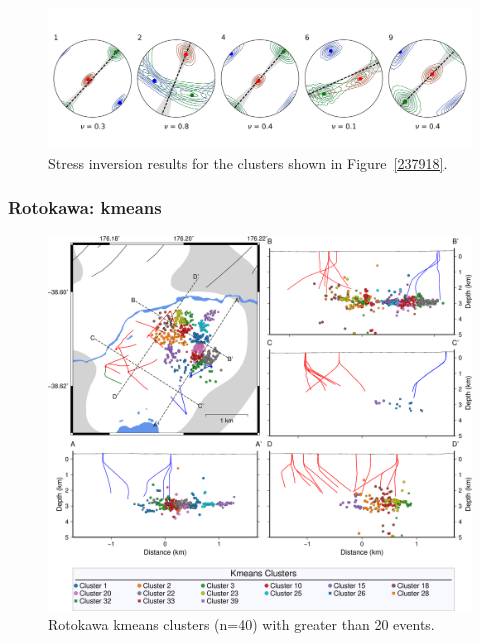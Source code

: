 \begin{figure}[h!]
\begin{center}
\includegraphics[width=0.98\columnwidth]{Chapter_5_FMs/figures/Nga_kmeans_inversion_10/Nga_kmeans_inversion_10_original}
\caption{{Stress inversion results for the clusters shown in
Figure~{\ref{237918}}.
{\label{838980}}%
}}
\end{center}
\end{figure}

\subsubsection{Rotokawa: kmeans}

\begin{figure}[h!]
\begin{center}
\includegraphics[width=1.00\columnwidth]{Chapter_5_FMs/figures/merc_Rot_kmeans_40/merc_Rot_kmeans_40_original}
\caption{{Rotokawa kmeans clusters (n=40) with greater than 20 events.
{\label{878143}}%
}}
\end{center}
\end{figure}

